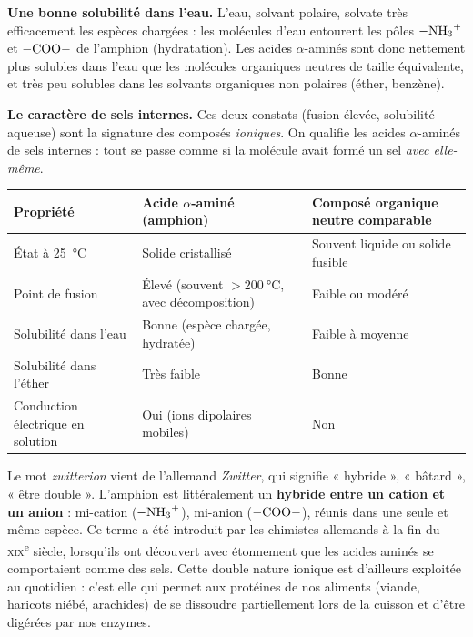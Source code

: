 \documentclass[11pt]{article}
\newcommand{\cle}[1]{{\popxbold\color{popdark}#1}}
\begin{document}
\textbf{Une bonne solubilité dans l'eau.} L'eau, solvant polaire, solvate très efficacement les espèces chargées : les molécules d'eau entourent les pôles $\ce{-NH3+}$ et $\ce{-COO-}$ de l'amphion (hydratation). Les acides $\alpha$-aminés sont donc nettement plus solubles dans l'eau que les molécules organiques neutres de taille équivalente, et très peu solubles dans les solvants organiques non polaires (éther, benzène).

\textbf{Le caractère de sels internes.} Ces deux constats (fusion élevée, solubilité aqueuse) sont la signature des composés \emph{ioniques}. On qualifie les acides $\alpha$-aminés de \cle{sels internes} : tout se passe comme si la molécule avait formé un sel \emph{avec elle-même}.

\begin{center}
\begin{tabularx}{\linewidth}{|l|X|X|}
\hline
\rowcolor{popblueL} \textbf{Propriété} & \textbf{Acide $\alpha$-aminé (amphion)} & \textbf{Composé organique neutre comparable} \\
\hline
État à \SI{25}{\celsius} & Solide cristallisé & Souvent liquide ou solide fusible \\
\hline
Point de fusion & Élevé (souvent $>\SI{200}{\celsius}$, avec décomposition) & Faible ou modéré \\
\hline
Solubilité dans l'eau & Bonne (espèce chargée, hydratée) & Faible à moyenne \\
\hline
Solubilité dans l'éther & Très faible & Bonne \\
\hline
Conduction électrique en solution & Oui (ions dipolaires mobiles) & Non \\
\hline
\end{tabularx}
\end{center}

\begin{savaistu}
Le mot \emph{zwitterion} vient de l'allemand \emph{Zwitter}, qui signifie « hybride », « bâtard », « être double ». L'amphion est littéralement un \textbf{hybride entre un cation et un anion} : mi-cation ($\ce{-NH3+}$), mi-anion ($\ce{-COO-}$), réunis dans une seule et même espèce. Ce terme a été introduit par les chimistes allemands à la fin du \textsc{xix}\textsuperscript{e} siècle, lorsqu'ils ont découvert avec étonnement que les acides aminés se comportaient comme des sels. Cette double nature ionique est d'ailleurs exploitée au quotidien : c'est elle qui permet aux protéines de nos aliments (viande, haricots niébé, arachides) de se dissoudre partiellement lors de la cuisson et d'être digérées par nos enzymes.
\end{savaistu}
\end{document}

